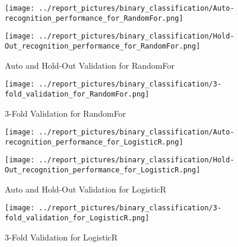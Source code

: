         \begin{figure}[H]
            \begin{minipage}[c]{.46\linewidth}
                  \texttt{[image: ../report\_pictures/binary\_classification/Auto-recognition\_performance\_for\_RandomFor.png]}
            \end{minipage} \hfill
            \begin{minipage}[c]{.46\linewidth}
                \texttt{[image: ../report\_pictures/binary\_classification/Hold-Out\_recognition\_performance\_for\_RandomFor.png]}
            \end{minipage}
            \caption{Auto and Hold-Out Validation for RandomFor}
            \label{CV_RandomFor}
        \end{figure}   
   
        \begin{figure}[H]
            \texttt{[image: ../report\_pictures/binary\_classification/3-fold\_validation\_for\_RandomFor.png]}
        \caption{3-Fold Validation for RandomFor}
        \label{3Fold_RandomFor}
        \end{figure} 
        
        \begin{figure}[H]
            \begin{minipage}[c]{.46\linewidth}
                  \texttt{[image: ../report\_pictures/binary\_classification/Auto-recognition\_performance\_for\_LogisticR.png]}
            \end{minipage} \hfill
            \begin{minipage}[c]{.46\linewidth}
                \texttt{[image: ../report\_pictures/binary\_classification/Hold-Out\_recognition\_performance\_for\_LogisticR.png]}
            \end{minipage}
            \caption{Auto and Hold-Out Validation for LogisticR}
            \label{CV_LogisticR}
        \end{figure}   
   
        \begin{figure}[H]
            \texttt{[image: ../report\_pictures/binary\_classification/3-fold\_validation\_for\_LogisticR.png]}
        \caption{3-Fold Validation for LogisticR}
        \label{3Fold_LogisticR}
        \end{figure} 
        